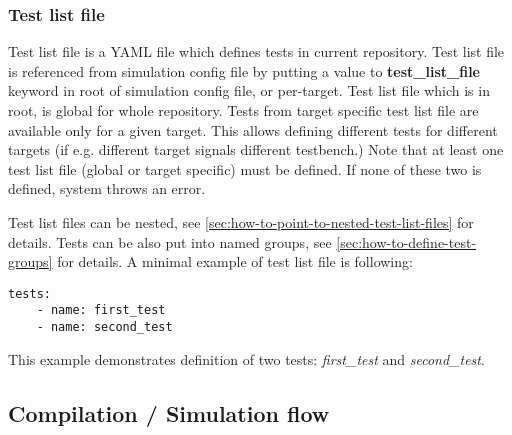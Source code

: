 \documentclass{tropic_design_spec}
\begin{document}
\subsubsection{Test list file}
\label{sec:test-list-file}

Test list file is a YAML file which defines tests in current repository.
Test list file is referenced from simulation config file by putting a value to
\textbf{test_list_file} keyword in root of simulation config file, or per-target. Test
list file which is in root, is global for whole repository. Tests from target specific
test list file are available only for a given target. This allows defining different
tests for different targets (if e.g. different target signals different testbench.)
Note that at least one test list file (global or target specific) must be defined.
If none of these two is defined, system throws an error.

Test list files can be nested, see \ref{sec:how-to-point-to-nested-test-list-files}
for details. Tests can be also put into named groups, see 
\ref{sec:how-to-define-test-groups} for details. A minimal example of test list file
is following:

\begin{lstlisting}
tests:
    - name: first_test
    - name: second_test
\end{lstlisting}

This example demonstrates definition of two tests: \textit{first_test} and 
\textit{second_test}.



\subsection{Compilation / Simulation flow}
\label{sec:compilation-simulation-flow}
\end{document}

